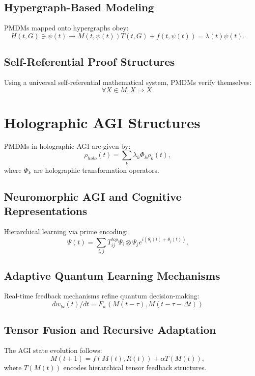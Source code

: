 \documentclass{article}
\theoremstyle{plain}
\begin{document}
\subsection{Hypergraph-Based Modeling}
PMDMs mapped onto hypergraphs obey:
\begin{equation}
    H(t, G) \ni \psi(t) \rightarrow M(t, \psi(t)) T(t, G) + f(t, \psi(t)) = \lambda(t) \psi(t).
\end{equation}
\subsection{Self-Referential Proof Structures}
Using a universal self-referential mathematical system, PMDMs verify themselves:
\begin{equation}
    \forall X \in M, X \Rightarrow X.
\end{equation}

\section{Holographic AGI Structures}
PMDMs in holographic AGI are given by:
\begin{equation}
    \rho_{holo}(t) = \sum_{k} \lambda_k \Phi_k \rho_k(t),
\end{equation}
where $\Phi_k$ are holographic transformation operators.

\subsection{Neuromorphic AGI and Cognitive Representations}
Hierarchical learning via prime encoding:
\begin{equation}
    \Psi(t) = \sum_{i,j} T_{ij}^{top} \Psi_i \otimes \Psi_j e^{i(\theta_i(t) + \theta_j(t))}.
\end{equation}
\subsection{Adaptive Quantum Learning Mechanisms}
Real-time feedback mechanisms refine quantum decision-making:
\begin{equation}
dw_{ki}(t)/dt = F_w(M(t-\tau), M(t-\tau-\Delta t))
\end{equation}
\subsection{Tensor Fusion and Recursive Adaptation}
The AGI state evolution follows:
\begin{equation}
    M(t+1) = f(M(t), R(t)) + \alpha T(M(t)),
\end{equation}
where $T(M(t))$ encodes hierarchical tensor feedback structures.
\end{document}
